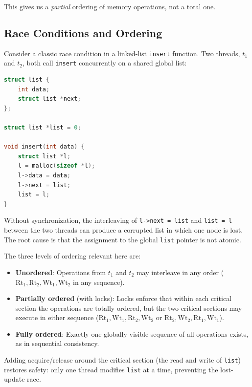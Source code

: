 \documentclass[11pt]{article}
\begin{document}
This gives us a \emph{partial} ordering of memory operations, not a total one.

\subsection{Race Conditions and Ordering}

Consider a classic race condition in a linked-list \texttt{insert} function. Two threads, $t_1$ and $t_2$, both call \texttt{insert} concurrently on a shared global list:

\begin{lstlisting}[language=C, caption={Linked list with race condition}]
struct list {
    int data;
    struct list *next;
};

struct list *list = 0;

void insert(int data) {
    struct list *l;
    l = malloc(sizeof *l);
    l->data = data;
    l->next = list;
    list = l;
}
\end{lstlisting}

Without synchronization, the interleaving of \texttt{l->next = list} and \texttt{list = l} between the two threads can produce a corrupted list in which one node is lost. The root cause is that the assignment to the global \texttt{list} pointer is not atomic.

The three levels of ordering relevant here are:

\begin{itemize}
    \item \textbf{Unordered}: Operations from $t_1$ and $t_2$ may interleave in any order ($\text{Rt}_1, \text{Rt}_2, \text{Wt}_1, \text{Wt}_2$ in any sequence).
    \item \textbf{Partially ordered} (with locks): Locks enforce that within each critical section the operations are totally ordered, but the two critical sections may execute in either sequence ($\text{Rt}_1, \text{Wt}_1, \text{Rt}_2, \text{Wt}_2$ or $\text{Rt}_2, \text{Wt}_2, \text{Rt}_1, \text{Wt}_1$).
    \item \textbf{Fully ordered}: Exactly one globally visible sequence of all operations exists, as in sequential consistency.
\end{itemize}

Adding acquire/release around the critical section (the read and write of \texttt{list}) restores safety: only one thread modifies \texttt{list} at a time, preventing the lost-update race.

\end{document}
